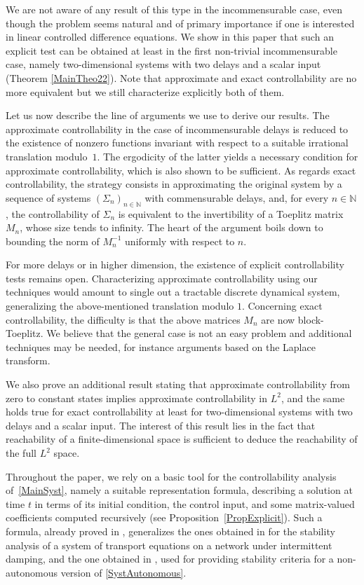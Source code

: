 \documentclass[10pt]{article}
\theoremstyle{plain}
\theoremstyle{definition}
\numberwithin{equation}{section}\numberwithin{figure}{section}\emergencystretch=3em
\begin{document}
We are not aware of any result of this type in the incommensurable case, even though the problem seems natural and of primary importance if one is interested in linear controlled difference equations. We show in this paper that such an explicit test can be obtained at least in the first non-trivial incommensurable case, namely two-dimensional systems with two delays and a scalar input (Theorem \ref{MainTheo22}). Note that approximate and exact controllability are no more equivalent but we still characterize explicitly both of them.

Let us now describe the line of arguments we use to derive our results. The approx\-imate controllability in the case of incommensurable delays is reduced to the existence of nonzero functions invariant with respect to a suitable irrational translation modulo~$1$. The ergodicity of the latter yields a necessary condition for approximate controllability, which is also shown to be sufficient. As regards exact controllability, the strategy consists in approximating the original system by a sequence of systems $(\Sigma_n)_{n \in \mathbb N}$ with commensurable delays, and, for every $n \in \mathbb N$, the controllability of $\Sigma_n$ is equivalent to the invertibility of a Toeplitz matrix $M_n$, whose size tends to infinity. The heart of the argument boils down to bounding the norm of $M_n^{-1}$ uniformly with respect to $n$.

For more delays or in higher dimension, the existence of explicit controllability tests remains open. Characterizing approximate controllability using our techniques would amount to single out a tractable discrete dynamical system, generalizing the above-mentioned translation modulo $1$. Concerning exact controllability, the difficulty is that the above matrices $M_n$ are now block-Toeplitz. We believe that the general case is not an easy problem and additional techniques may be needed, for instance arguments based on the Laplace transform.

We also prove an additional result stating that approximate controllability from zero to constant states implies approximate controllability in $L^2$, and the same holds true for exact controllability at least for two-dimensional systems with two delays and a scalar input. The interest of this result lies in the fact that reachability of a finite-dimensional space is sufficient to deduce the reachability of the full $L^2$ space.

Throughout the paper, we rely on a basic tool for the controllability analysis of~\eqref{MainSyst}, namely a suitable representation formula, describing a solution at time $t$ in terms of its initial condition, the control input, and some matrix-valued coefficients computed recursively (see Proposition~\ref{PropExplicit}). Such a formula, already proved in \cite{Mazanti2017Relative}, generalizes the ones obtained in \cite[Th.\,3.3 \& 3.6]{Chitour2017Persistently} for the stability analysis of a system of transport equations on a network under intermittent damping, and the one obtained in \cite[Prop.\,3.14]{Chitour2016Stability}, used for providing stability criteria for a non-autonomous version of \eqref{SystAutonomous}.
\end{document}
